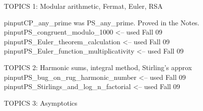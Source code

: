\documentclass[handout]{mcs}
\begin{document}


\begin{staffnotes}
TOPICS 1: Modular arithmetic, Fermat, Euler, RSA

pinput{CP_any_prime} was PS_any_prime.  Proved in the Notes.
pinput{PS_congruent_modulo_1000}              <-- used Fall 09
pinput{PS_Euler_theorem_calculation}           <-- used Fall 09
pinput{PS_Euler_function_multiplicativity}      <-- used Fall 09
\end{staffnotes}



\begin{staffnotes}
TOPICS 2: Harmonic sums, integral method, Stirling's approx 
pinput{PS_bug_on_rug_harmonic_number}   <-- used Fall 09
pinput{PS_Stirlings_and_log_n_factorial}        <-- used Fall 09
\end{staffnotes}


\begin{staffnotes}
TOPICS 3: Asymptotics
\end{staffnotes}


\end{document}
